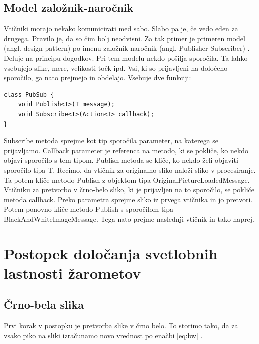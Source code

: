 \documentclass[oneside, a4paper, 12pt]{book}
\begin{document}
\subsection{Model založnik-naročnik}
Vtičniki morajo nekako komunicirati med sabo. Slabo pa je, če vedo 
eden za drugega. Pravilo je, da so čim bolj neodvisni. Za tak primer 
je primeren model (angl. design pattern) po imenu založnik-naročnik 
(angl. Publisher-Subscriber) \cite{oreilly-dp, oreilly-cs}. Deluje na 
principu dogodkov. Pri tem modelu nekdo pošilja sporočila. Ta lahko 
vsebujejo slike, mere, velikosti točk ipd. Vsi, ki so prijavljeni na 
določeno sporočilo, ga nato prejmejo in obdelajo. Vsebuje dve funkciji:
\begin{samepage}
\begin{verbatim}
class PubSub {
    void Publish<T>(T message);
    void Subscribe<T>(Action<T> callback);
}
\end{verbatim}
\end{samepage}
Subscribe metoda sprejme kot tip sporočila parameter, na katerega se 
prijavljamo. Callback parameter je referenca na metodo, ki se pokliče, 
ko nekdo objavi sporočilo s tem tipom. Publish metoda se kliče, ko nekdo 
želi objaviti sporočilo tipa T. Recimo, da vtičnik za originalno sliko 
naloži sliko v procesiranje. Ta potem kliče metodo Publish z objektom 
tipa OriginalPictureLoadedMessage. Vtičniku za pretvorbo v črno-belo 
sliko, ki je prijavljen na to sporočilo, se pokliče metoda callback. 
Preko parametra sprejme sliko iz prvega vtičnika in jo pretvori. Potem 
ponovno kliče metodo Publish s sporočilom tipa 
Black\-And\-White\-Image\-Message. Tega nato prejme naslednji vtičnik 
in tako naprej.

\section{Postopek določanja svetlobnih lastnosti žarometov}
\subsection{Črno-bela slika}
Prvi korak v postopku je pretvorba slike v črno belo. To storimo tako, 
da za vsako piko na sliki izračunamo novo vrednost po enačbi \ref{eq:bw} 
\cite{LHS}.
\end{document}
